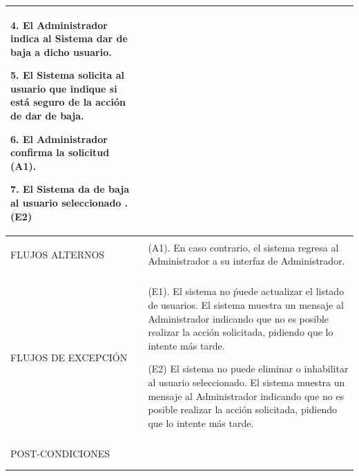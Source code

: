 \begin{longtable}{@{\extracolsep{8pt}}l p{8.5cm}}
 4. El Administrador indica al Sistema dar de baja a dicho usuario. \par\vspace{.1cm}

 5. El Sistema solicita al usuario que indique si está seguro de la acción de dar de baja. \par\vspace{.1cm}

 6. El Administrador confirma la solicitud (A1). \par\vspace{.1cm}

 7. El Sistema da de baja al usuario seleccionado .(E2) \par\vspace{.1cm}

\\
\hline \\[-1ex]

FLUJOS ALTERNOS & 
\par (A1). En caso contrario, el sistema regresa al Administrador a su interfaz de Administrador.



\\
\hline \\[-1ex]

FLUJOS DE EXCEPCIÓN & 
\par\vspace{.1cm} (E1). El sistema no ṕuede actualizar el listado de usuarios. El sistema muestra un mensaje al Administrador indicando que no es posible realizar la acción solicitada, pidiendo que lo intente más tarde.

\par\vspace{.1cm} (E2) El sistema no puede eliminar o inhabilitar al usuario seleccionado. El sistema muestra un mensaje al Administrador indicando que no es posible realizar la acción solicitada, pidiendo que lo intente más tarde.


\\%

\hline \\[-1ex]
POST-CONDICIONES & 
\\
\hline
\hline \\[-1.8ex]
 \\
\end{longtable}


\pagebreak





